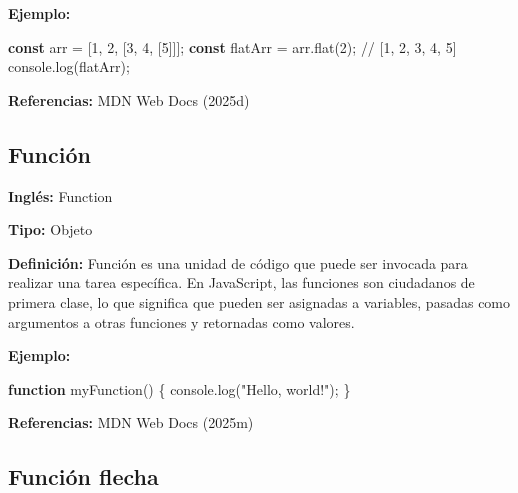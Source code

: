 \documentclass[
  letterpaper,
  DIV=11,
  numbers=noendperiod]{scrreprt}
\newenvironment{Shaded}{\begin{snugshade}}{\end{snugshade}}
\newcommand{\BuiltInTok}[1]{\textcolor[rgb]{0.00,0.23,0.31}{#1}}
\newcommand{\CommentTok}[1]{\textcolor[rgb]{0.37,0.37,0.37}{#1}}
\newcommand{\DecValTok}[1]{\textcolor[rgb]{0.68,0.00,0.00}{#1}}
\newcommand{\FunctionTok}[1]{\textcolor[rgb]{0.28,0.35,0.67}{#1}}
\newcommand{\KeywordTok}[1]{\textcolor[rgb]{0.00,0.23,0.31}{\textbf{#1}}}
\newcommand{\NormalTok}[1]{\textcolor[rgb]{0.00,0.23,0.31}{#1}}
\newcommand{\OperatorTok}[1]{\textcolor[rgb]{0.37,0.37,0.37}{#1}}
\newcommand{\StringTok}[1]{\textcolor[rgb]{0.13,0.47,0.30}{#1}}
\let\oldsubsection\subsection
\renewcommand{\subsection}{\phantomsection\oldsubsection}
\begin{document}
\textbf{Ejemplo:}

\begin{Shaded}
\begin{Highlighting}[]
\KeywordTok{const}\NormalTok{ arr }\OperatorTok{=}\NormalTok{ [}\DecValTok{1}\OperatorTok{,} \DecValTok{2}\OperatorTok{,}\NormalTok{ [}\DecValTok{3}\OperatorTok{,} \DecValTok{4}\OperatorTok{,}\NormalTok{ [}\DecValTok{5}\NormalTok{]]]}\OperatorTok{;}
\KeywordTok{const}\NormalTok{ flatArr }\OperatorTok{=}\NormalTok{ arr}\OperatorTok{.}\FunctionTok{flat}\NormalTok{(}\DecValTok{2}\NormalTok{)}\OperatorTok{;} \CommentTok{// [1, 2, 3, 4, 5]}
\BuiltInTok{console}\OperatorTok{.}\FunctionTok{log}\NormalTok{(flatArr)}\OperatorTok{;}
\end{Highlighting}
\end{Shaded}

\textbf{Referencias:} MDN Web Docs (2025d)

\subsection*{Función}\label{glos-funcion}

\textbf{Inglés:} Function

\textbf{Tipo:} Objeto

\textbf{Definición:} Función es una unidad de código que puede ser
invocada para realizar una tarea específica. En JavaScript, las
funciones son ciudadanos de primera clase, lo que significa que pueden
ser asignadas a variables, pasadas como argumentos a otras funciones y
retornadas como valores.

\textbf{Ejemplo:}

\begin{Shaded}
\begin{Highlighting}[]
\KeywordTok{function} \FunctionTok{myFunction}\NormalTok{() \{}
    \BuiltInTok{console}\OperatorTok{.}\FunctionTok{log}\NormalTok{(}\StringTok{"Hello, world!"}\NormalTok{)}\OperatorTok{;}
\NormalTok{\}}
\end{Highlighting}
\end{Shaded}

\textbf{Referencias:} MDN Web Docs (2025m)

\subsection*{Función flecha}\label{glos-funcion_flecha}
\end{document}
